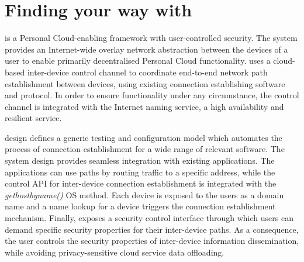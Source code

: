% 


\section{Finding your way with \signpost}\label{sec:sp-signpost}

\signpost is a Personal Cloud-enabling framework with user-controlled security.
The system provides an Internet-wide overlay network abstraction between the
devices of a user to enable primarily decentralised Personal Cloud
functionality.  \signpost uses a cloud-based inter-device control channel to
coordinate end-to-end network path establishment between devices, using existing
connection establishing software and protocol.  In order to ensure functionality
under any circumstance, the \signpost control channel is integrated with the
Internet naming service, a high availability and resilient service. 

\signpost design defines a generic testing and configuration model which
automates the process of connection establishment for a wide range of relevant
software.  The system design provides seamless integration with existing
applications. The applications can use \signpost paths by routing traffic to a
\signpost specific address, while the control API for inter-device connection
establishment is integrated with the \textit{gethostbyname()} OS method.  Each
device is exposed to the users as a domain name and a name lookup for a device
triggers the \signpost connection establishment mechanism. Finally, \signpost
exposes a security control interface through which users can demand specific
security properties for their inter-device paths. As a consequence, the user
controls the security properties of inter-device information dissemination,
while avoiding privacy-sensitive cloud service data offloading. 

